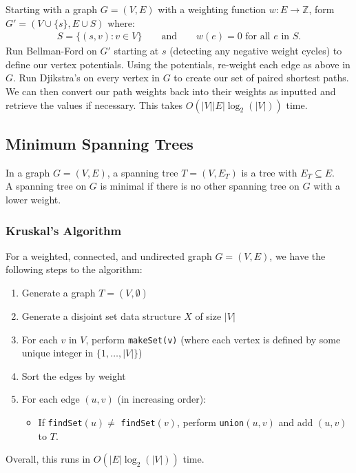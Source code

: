 Starting with a graph $G = (V, E)$ with a weighting function $w : E \to \mathbb{Z}$,
form $G' = (V \cup \{s\}, E \cup S)$ where: \begin{gather*}
  S = \{(s, v) : v \in V\} \qquad \text{and} \qquad w(e) = 0 \text{ for all } e \text{ in } S.
\end{gather*} Run Bellman-Ford on $G'$ starting at $s$ (detecting any negative weight cycles)
to define our vertex potentials. Using the potentials, re-weight each edge as above
in $G$. Run Djikstra's on every vertex in $G$ to create our set of paired shortest paths.
We can then convert our path weights back into their weights as inputted and retrieve the
values if necessary. This takes $O(|V||E|\log_2(|V|))$ time.

\subsection{Minimum Spanning Trees}

In a graph $G = (V, E)$, a spanning tree $T = (V, E_T)$ is a tree
with $E_T \subseteq E$.
\\[\baselineskip]
A spanning tree on $G$ is minimal if there is no other spanning tree
on $G$ with a lower weight.

\subsubsection{Kruskal's Algorithm}

For a weighted, connected, and undirected graph $G = (V, E)$, we have 
the following steps to the algorithm: \begin{enumerate}
  \item Generate a graph $T = (V, \emptyset)$
  \item Generate a disjoint set data structure $X$ of size $|V|$
  \item For each $v$ in $V$, perform \texttt{makeSet(v)} (where
  each vertex is defined by some unique integer in $\{1, \ldots, |V|\}$)
  \item Sort the edges by weight
  \item For each edge $(u, v)$ (in increasing order): \begin{itemize}
    \item If \texttt{findSet}$(u) \neq$ \texttt{findSet}$(v)$,
    perform \texttt{union}$(u, v)$ and add $(u, v)$ to $T$.
  \end{itemize}
\end{enumerate} Overall, this runs in $O(|E| \log_2(|V|))$ time.